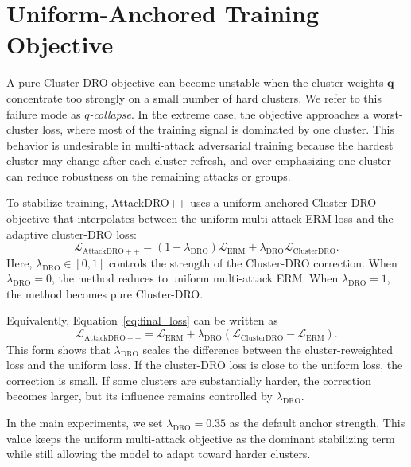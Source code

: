 \section{Uniform-Anchored Training Objective}
\label{sec:ch4_anchor_objective}

A pure Cluster-DRO objective can become unstable when the cluster weights
\(\mathbf{q}\) concentrate too strongly on a small number of hard clusters. We refer
to this failure mode as \emph{\(q\)-collapse}. In the extreme case, the objective
approaches a worst-cluster loss, where most of the training signal is dominated by
one cluster. This behavior is undesirable in multi-attack adversarial training because
the hardest cluster may change after each cluster refresh, and over-emphasizing one
cluster can reduce robustness on the remaining attacks or groups.

To stabilize training, AttackDRO++ uses a uniform-anchored Cluster-DRO objective
that interpolates between the uniform multi-attack ERM loss and the adaptive
cluster-DRO loss:
\begin{equation}
    \mathcal{L}_{\mathrm{AttackDRO++}}
        =
        (1 - \lambda_{\mathrm{DRO}})\mathcal{L}_{\mathrm{ERM}}
        +
        \lambda_{\mathrm{DRO}}\mathcal{L}_{\mathrm{ClusterDRO}} .
    \label{eq:final_loss}
\end{equation}
Here, \(\lambda_{\mathrm{DRO}}\in[0,1]\) controls the strength of the Cluster-DRO
correction. When \(\lambda_{\mathrm{DRO}}=0\), the method reduces to uniform
multi-attack ERM. When \(\lambda_{\mathrm{DRO}}=1\), the method becomes pure
Cluster-DRO.

Equivalently, Equation~\eqref{eq:final_loss} can be written as
\begin{equation}
    \mathcal{L}_{\mathrm{AttackDRO++}}
        =
        \mathcal{L}_{\mathrm{ERM}}
        +
        \lambda_{\mathrm{DRO}}
        \left(
            \mathcal{L}_{\mathrm{ClusterDRO}}
            -
            \mathcal{L}_{\mathrm{ERM}}
        \right).
\end{equation}
This form shows that \(\lambda_{\mathrm{DRO}}\) scales the difference between the
cluster-reweighted loss and the uniform loss. If the cluster-DRO loss is close to the
uniform loss, the correction is small. If some clusters are substantially harder, the
correction becomes larger, but its influence remains controlled by
\(\lambda_{\mathrm{DRO}}\).

In the main experiments, we set \(\lambda_{\mathrm{DRO}}=0.35\) as the default anchor strength. This value keeps the uniform multi-attack objective as
the dominant stabilizing term while still allowing the model to adapt toward harder
clusters.

